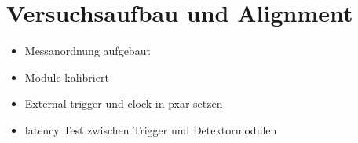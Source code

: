 \documentclass[usenames,dvipsnames]{include/protokollclass}
\begin{document}
    \FrontMatter
\begin{titlepage}


\end{titlepage}

    \begingroup \let\clearpage\relax    %
    \tableofcontents                    %
    \listoffigures
    \listoftables
    \endgroup



    \MainMatter
    
            
%    
%
%    
%
%	 
%
	
	\chapter{Versuchsaufbau und Alignment}
	\begin{itemize}
		\item Messanordnung aufgebaut
		\item Module kalibriert
		\item External trigger und clock in pxar setzen
		\item latency Test zwischen Trigger und Detektormodulen
	\end{itemize}
\end{document}
